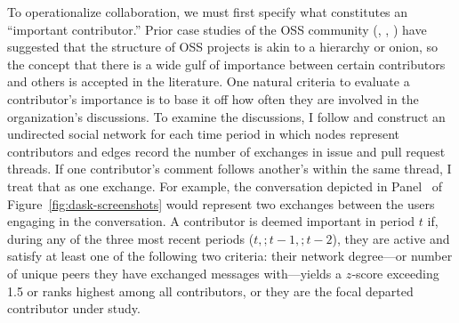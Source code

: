 \documentclass[12pt,notitlepage]{article}
\begin{document}
To operationalize collaboration, we must first specify what constitutes an “important contributor.” Prior case studies of the OSS community (\cite{cox_cathedrals_1998}, \cite{mockus_two_2002}, \cite{gacek_many_2004}) have suggested that the structure of OSS projects is akin to a hierarchy or onion, so the concept that there is a wide gulf of importance between certain contributors and others is accepted in the literature. One natural criteria to evaluate a contributor's importance is to base it off how often they are involved in the organization's discussions. To examine the discussions, I follow \cite{crowston_hierarchy_2006} and construct an undirected social network for each time period in which nodes represent contributors and edges record the number of exchanges in issue and pull request threads. If one contributor’s comment follows another’s within the same thread, I treat that as one exchange. For example, the conversation depicted in Panel~ of Figure~\ref{fig:dask-screenshots} would represent two exchanges between the users engaging in the conversation. A contributor is deemed important in period $t$ if, during any of the three most recent periods ($t,;t-1,;t-2$), they are active and satisfy at least one of the following two criteria: their network degree—or number of unique peers they have exchanged messages with—yields a $z$‐score exceeding 1.5 or ranks highest among all contributors, or they are the focal departed contributor under study. 
\end{document}
